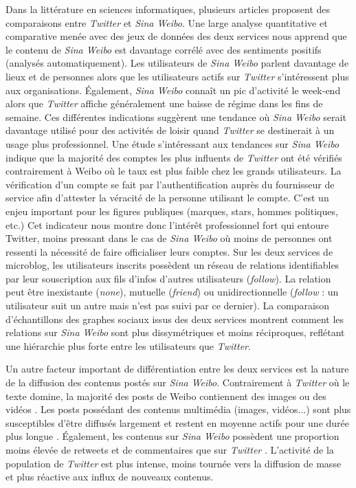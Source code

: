Dans la littérature en sciences informatiques, plusieurs articles proposent des comparaisons entre \textit{Twitter} et \textit{Sina Weibo}. Une large analyse quantitative et comparative menée avec des jeux de données des deux services \citep{Gao2012} nous apprend que le contenu de \textit{Sina Weibo} est davantage corrélé avec des sentiments positifs (analysés automatiquement). Les utilisateurs de \textit{Sina Weibo} parlent davantage de lieux et de personnes alors que les utilisateurs actifs sur \textit{Twitter} s’intéressent plus aux organisations. Également, \textit{Sina Weibo} connaît un pic d’activité le week-end alors que \textit{Twitter} affiche généralement une baisse de régime dans les fins de semaine. Ces différentes indications suggèrent une tendance où \textit{Sina Weibo} serait davantage utilisé pour des activités de loisir quand \textit{Twitter} se destinerait à un usage plus professionnel. Une étude s’intéressant aux tendances sur \textit{Sina Weibo} \citep{Yu2011} indique que la majorité des comptes les plus influents de \textit{Twitter} ont été vérifiés contrairement à Weibo où le taux est plus faible chez les grands utilisateurs. La vérification d’un compte se fait par l’authentification auprès du fournisseur de service afin d’attester la véracité de la personne utilisant le compte. C’est un enjeu important pour les figures publiques (marques, stars, hommes politiques, etc.) Cet indicateur nous montre donc l’intérêt professionnel fort qui entoure Twitter, moins pressant dans le cas de \textit{Sina Weibo} où moins de personnes ont ressenti la nécessité de faire officialiser leurs comptes. Sur les deux services de microblog, les utilisateurs inscrits possèdent un réseau de relations identifiables par leur souscription aux fils d’infos d’autres utilisateurs (\textit{follow}). La relation peut être inexistante (\textit{none}), mutuelle (\textit{friend}) ou unidirectionnelle (\textit{follow} : un utilisateur suit un autre mais n’est pas suivi par ce dernier). La comparaison d’échantillons des graphes sociaux issus des deux services \citep{Chen2012} montrent comment les relations sur \textit{Sina Weibo} sont plus dissymétriques et moins réciproques, reflétant une hiérarchie plus forte entre les utilisateurs que \textit{Twitter}. 

Un autre facteur important de différentiation entre les deux services est la nature de la diffusion des contenus postés sur \textit{Sina Weibo}. Contrairement à \textit{Twitter} où le texte domine, la majorité des posts de Weibo contiennent des images ou des vidéos \citep{Zhao2012}. Les posts possédant des contenus multimédia (images, vidéos...) sont plus susceptibles d’être diffusés largement et restent en moyenne actifs pour une durée plus longue \citep{Zhao2012}. Également, les contenus sur \textit{Sina Weibo} possèdent une proportion moins élevée de retweets et de commentaires que sur \textit{Twitter} \citep{Zhao2012, Gao2012}. L’activité de la population de \textit{Twitter} est plus intense, moins tournée vers la diffusion de masse et plus réactive aux influx de nouveaux contenus. 

